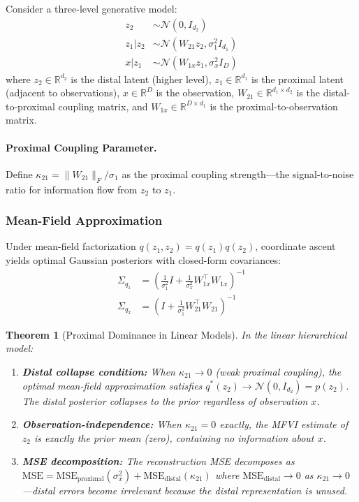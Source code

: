 \documentclass[10pt]{article} %
\theoremstyle{plain}
\newtheorem{theorem}{Theorem}[section]
\theoremstyle{definition}
\begin{document}
Consider a three-level generative model:
\begin{align}
z_2 &\sim \mathcal{N}(0, I_{d_2}) \\
z_1 | z_2 &\sim \mathcal{N}(W_{21} z_2, \sigma_1^2 I_{d_1}) \\
x | z_1 &\sim \mathcal{N}(W_{1x} z_1, \sigma_x^2 I_D)
\end{align}
where $z_2 \in \mathbb{R}^{d_2}$ is the distal latent (higher level), $z_1 \in \mathbb{R}^{d_1}$ is the proximal latent (adjacent to observations), $x \in \mathbb{R}^D$ is the observation, $W_{21} \in \mathbb{R}^{d_1 \times d_2}$ is the distal-to-proximal coupling matrix, and $W_{1x} \in \mathbb{R}^{D \times d_1}$ is the proximal-to-observation matrix.

\paragraph{Proximal Coupling Parameter.} Define $\kappa_{21} = \|W_{21}\|_F / \sigma_1$ as the proximal coupling strength---the signal-to-noise ratio for information flow from $z_2$ to $z_1$.

\subsubsection{Mean-Field Approximation}

Under mean-field factorization $q(z_1, z_2) = q(z_1) q(z_2)$, coordinate ascent yields optimal Gaussian posteriors with closed-form covariances:
\begin{align}
\Sigma_{q_1} &= \left(\frac{1}{\sigma_1^2}I + \frac{1}{\sigma_x^2}W_{1x}^\top W_{1x}\right)^{-1} \\
\Sigma_{q_2} &= \left(I + \frac{1}{\sigma_1^2}W_{21}^\top W_{21}\right)^{-1}
\end{align}

\begin{theorem}[Proximal Dominance in Linear Models]
\label{thm:linear-proximal}
In the linear hierarchical model:
\begin{enumerate}
    \item \textbf{Distal collapse condition:} When $\kappa_{21} \to 0$ (weak proximal coupling), the optimal mean-field approximation satisfies $q^*(z_2) \to \mathcal{N}(0, I_{d_2}) = p(z_2)$. The distal posterior collapses to the prior regardless of observation $x$.
    
    \item \textbf{Observation-independence:} When $\kappa_{21} = 0$ exactly, the MFVI estimate of $z_2$ is exactly the prior mean (zero), containing no information about $x$.
    
    \item \textbf{MSE decomposition:} The reconstruction MSE decomposes as $\text{MSE} = \text{MSE}_{\text{proximal}}(\sigma_x^2) + \text{MSE}_{\text{distal}}(\kappa_{21})$ where $\text{MSE}_{\text{distal}} \to 0$ as $\kappa_{21} \to 0$---distal errors become irrelevant because the distal representation is unused.
\end{enumerate}
\end{theorem}
\end{document}
